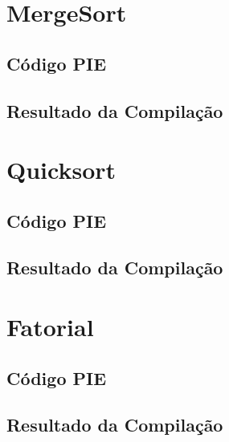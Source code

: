 \section{MergeSort}
\subsection{Código PIE}
\begin{footnotesize}

\end{footnotesize}
\subsection{Resultado da Compilação}
\begin{footnotesize}
	
\end{footnotesize}
\newpage
\section{Quicksort}
\subsection{Código PIE}
\begin{footnotesize}

\end{footnotesize}
\subsection{Resultado da Compilação}
\begin{footnotesize}
	
\end{footnotesize}
\newpage
\section{Fatorial}
\subsection{Código PIE}
\begin{footnotesize}

\end{footnotesize}
\subsection{Resultado da Compilação}
\begin{footnotesize}
	
\end{footnotesize}
\newpage
